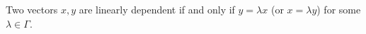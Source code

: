 Two vectors $x, y$ are linearly dependent if and only if $y = \lambda x$ (or $x = \lambda y$) for some $\lambda \in \Gamma$.
